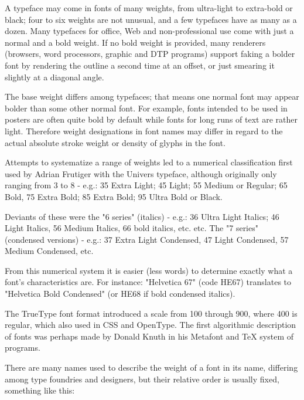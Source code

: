 \begin{multicols}{3}
A typeface may come in fonts of many weights, from ultra-light to extra-bold or black; four to six weights are not unusual, and a few typefaces have as many as a dozen. Many typefaces for office, Web and non-professional use come with just a normal and a bold weight. If no bold weight is provided, many renderers (browsers, word processors, graphic and DTP programs) support faking a bolder font by rendering the outline a second time at an offset, or just smearing it slightly at a diagonal angle.

The base weight differs among typefaces; that means one normal font may appear bolder than some other normal font. For example, fonts intended to be used in posters are often quite bold by default while fonts for long runs of text are rather light. Therefore weight designations in font names may differ in regard to the actual absolute stroke weight or density of glyphs in the font.

Attempts to systematize a range of weights led to a numerical classification first used by Adrian Frutiger with the Univers typeface, although originally only ranging from 3 to 8 - e.g.: 35 Extra Light; 45 Light; 55 Medium or Regular; 65 Bold, 75 Extra Bold; 85 Extra Bold; 95 Ultra Bold or Black.

Deviants of these were the "6 series" (italics) - e.g.: 36 Ultra Light Italics; 46 Light Italics, 56 Medium Italics, 66 bold italics, etc. etc. The "7 series" (condensed versions) - e.g.: 37 Extra Light Condensed, 47 Light Condensed, 57 Medium Condensed, etc.

From this numerical system it is easier (less words) to determine exactly what a font's characteristics are. For instance: "Helvetica 67" (code HE67) translates to "Helvetica Bold Condensed" (or HE68 if bold condensed italics).

The TrueType font format introduced a scale from 100 through 900, where 400 is regular, which also used in CSS and OpenType. The first algorithmic description of fonts was perhaps made by Donald Knuth in his Metafont and TeX system of programs.

There are many names used to describe the weight of a font in its name, differing among type foundries and designers, but their relative order is usually fixed, something like this:


\end{multicols}
